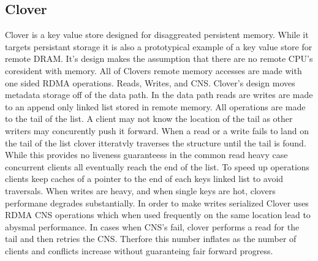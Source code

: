 \subsection{Clover}

Clover is a key value store designed for disaggreated persistent memory. While
it targets persistant storage it is also a prototypical example of a key value
store for remote DRAM. It's design makes the assumption that there are no remote
CPU's coresident with memory. All of Clovers remote memory accesses are made
with one sided RDMA operations. Reads, Writes, and CNS. Clover's design moves
metadata storage off of the data path. In the data path reads are writes are
made to an append only linked list stored in remote memory. All operations are
made to the tail of the list. A client may not know the location of the tail as
other writers may concurently push it forward. When a read or a write fails to
land on the tail of the list clover itteratvly traverses the structure until the
tail is found. While this provides no liveness guaranteess in the common read
heavy case concurrent clients all eventually reach the end of the list. To speed
up operations clients keep caches of a pointer to the end of each keys linked
list to avoid traversals. When writes are heavy, and when single keys are hot,
clovers performane degrades substantially. In order to make writes serialized
Clover uses RDMA CNS operations which when used frequently on the same location
lead to abysmal performance. In cases when CNS's fail, clover performs a read
for the tail and then retries the CNS. Therfore this number inflates as the
number of clients and conflicts increase without guaranteing fair forward
progress.

